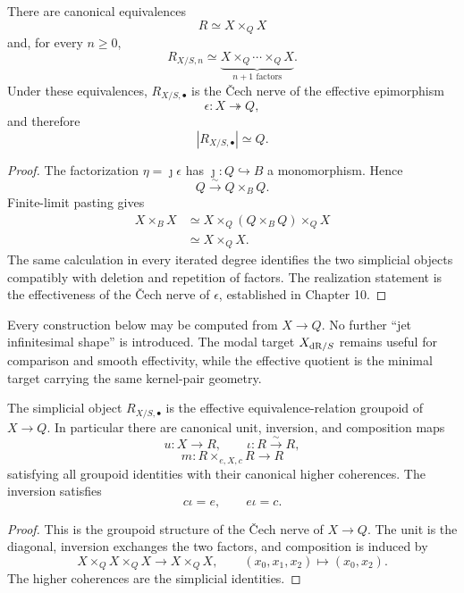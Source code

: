\begin{proposition}
\label{prop:jets-effective-relation}
There are canonical equivalences
\[
    R\simeq X\times_QX
\]
and, for every $n\geq0$,
\[
    R_{X/S,n}
    \simeq
    \underbrace{X\times_Q\cdots\times_QX}_{n+1\text{ factors}}.
\]
Under these equivalences, $R_{X/S,\bullet}$ is the \v{C}ech nerve of the effective epimorphism
\[
    \epsilon:X\twoheadrightarrow Q,
\]
and therefore
\[
    |R_{X/S,\bullet}|\simeq Q.
\]
\end{proposition}

\begin{proof}
The factorization $\eta=\jmath\epsilon$ has $\jmath:Q\hookrightarrow B$ a monomorphism.  Hence
\[
    Q\xrightarrow{\sim}Q\times_BQ.
\]
Finite-limit pasting gives
\[
\begin{aligned}
X\times_BX
&\simeq
X\times_Q(Q\times_BQ)\times_QX\\
&\simeq
X\times_QX.
\end{aligned}
\]
The same calculation in every iterated degree identifies the two simplicial objects compatibly with deletion and repetition of factors.  The realization statement is the effectiveness of the \v{C}ech nerve of $\epsilon$, established in Chapter 10.
\end{proof}

\begin{remark}
\label{rem:no-new-infinitesimal-object}
Every construction below may be computed from $X\to Q$.  No further ``jet infinitesimal shape'' is introduced.  The modal target $X_{\mathrm{dR}/S}$ remains useful for comparison and smooth effectivity, while the effective quotient is the minimal target carrying the same kernel-pair geometry.
\end{remark}

\begin{proposition}
\label{prop:jets-relation-groupoid}
The simplicial object $R_{X/S,\bullet}$ is the effective equivalence-relation groupoid of $X\to Q$.  In particular there are canonical unit, inversion, and composition maps
\[
    u:X\longrightarrow R,
    \qquad
    \iota:R\xrightarrow{\sim}R,
\]
\[
    m:R\times_{e,X,c}R\longrightarrow R
\]
satisfying all groupoid identities with their canonical higher coherences.  The inversion satisfies
\[
    c\iota=e,
    \qquad
    e\iota=c.
\]
\end{proposition}

\begin{proof}
This is the groupoid structure of the \v{C}ech nerve of $X\to Q$.  The unit is the diagonal, inversion exchanges the two factors, and composition is induced by
\[
    X\times_QX\times_QX\longrightarrow X\times_QX,
    \qquad
    (x_0,x_1,x_2)\longmapsto(x_0,x_2).
\]
The higher coherences are the simplicial identities.
\end{proof}

